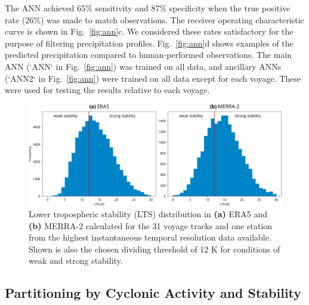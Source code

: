 \documentclass[draft]{agujournal2019}
\begin{document}
The ANN achieved 65\% sensitivity and 87\% specificity when the true positive rate (26\%) was made to match observations. The receiver operating characteristic curve is shown in Fig.~\ref{fig:ann}c. We considered these rates satisfactory for the purpose of filtering precipitation profiles. Fig.~\ref{fig:ann}d shows examples of the predicted precipitation compared to human-performed observations. The main ANN (`ANN` in Fig.~\ref{fig:ann}) was trained on all data, and ancillary ANNs (`ANN2` in Fig.~\ref{fig:ann}) were trained on all data except for each voyage. These were used for testing the results relative to each voyage.

\begin{figure}[b!]
\centering
\includegraphics[width=\textwidth]{img/lts_dist.pdf}
\caption{
Lower tropospheric stability (LTS) distribution in \textbf{(a)} ERA5 and \textbf{(b)} MERRA-2 calculated for the 31 voyage tracks and one station from the highest instantaneous temporal resolution data available. Shown is also the chosen dividing threshold of 12 K for conditions of weak and strong stability.
}
\label{fig:lts}
\end{figure}

\subsection{Partitioning by Cyclonic Activity and Stability}
\label{sec:cyclone-stability}
\end{document}
